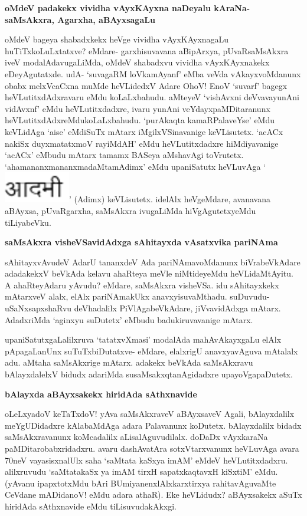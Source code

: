 {\bigskip
\noindent
{\large\bf oMdeV padakekx vividha vAyxKAyxna naDeyalu kAraNa- saMsAkxra, Agarxha, aBAyxsagaLu}}\label{page212}
\medskip

\noindent
oMdeV bageya shabadxkekx heVge vividha vAyxKAyxnagaLu huTiTxkoLuLxtatxve? eMdare- garxhisuvavana aBi\-pArxya, pUvaRsaMsAkxra iveV modalAdavugaLiMda, oMdeV shabadxvu vividha vAyxKAyxnakekx eDeyAgu\-tatxde. udA- `suvagaRM loVkamAyanf' eMba veVda vAkayxvoMdanunx obabx melxVcaCxna muMde heVLidedxV Adare OhoV! EnoV `suvarf' bagegx heVLutitxdAdxravaru eMdu koLaLxbahudu. aMteyeV `vishAvxni deVvavayu\-nAni vidAvxnf' eMdu heVLutitxdadxre, ivaru yunAni veYdayxpaMDitaranunx heVLutitxdAdxreMdukoLaLxbahudu. `purAkaqta kamaRPalaveYse' eMdu keVLidAga `aise' eMdiSuTx mAtarx iMgilxVSinavanige keVLisutetx. `acACx nakiSx duyxmatatxmoV rayiMdAH'\label{113} eMdu heVLutitxdadxre hiMdiyavanige `acACx' eMbudu mAtarx tamamx BASeya aMshavAgi toVrutetx. `ahamananxmananxmadaMtamAdimx' eMdu upaniSatutx heVLuvAga `{\includegraphics[scale=.6]{fig2.eps}}' (Adimx) keVLisutetx. idelAlx heVgeMdare, avanavana aBAyxsa, pUvaRgarxha, saMsAkxra ivugaLiMda hiVgAgutetxyeMdu tiLiyabeVku.

{\bigskip
\noindent
{\large\bf saMsAkxra visheVSavidAdxga sAhitayxda vAsatxvika pariNAma}}\label{page213}
\medskip

\noindent
sAhitayxvAvudeV AdarU tananxdeV Ada pariNAmavoMdanunx biVrabeVkAdare adadakekxV beVkAda kelavu ahaRteya meVle niMtideyeMdu heVLidaMtAyitu. A ahaRteyAdaru yAvudu? eMdare, saM\-sAkxra visheVSa. idu sAhitayxkekx mAtarxveV alalx, elAlx pariNAmakUkx anavxyisuvaMthadu. suDuvudu- uSaNxsapxshaRvu deVhadalilx PiVlAgabeVkAdare, jiVvavidAdxga mAtarx. AdadxriMda `aginxyu suDutetx' eMbudu badukiruvavanige mAtarx.

upaniSatutxgaLalilxruva `tatatxvXmasi' modalAda mahAvAkayxgaLu elAlx pApa\-gaLanUnx suTuTxbiDutatxve- eMdare, elalxrigU anavxyavAguva mAtalalx adu. \hbox{aMtaha} saMsAkxrige mAtarx. adakekx beVkAda saMsAkxravu bAlayxdalelxV bidudx adariMda susaMsakxqtanAgidadxre upayoVgapaDutetx.

{\bigskip
\noindent
{\large\bf bAlayxda aBAyxsakekx hiridAda sAthxnavide}}\label{page213}
\medskip

\noindent
oLeLxyadoV keTaTxdoV! yAva saMsAkxraveV aBAyxsaveV Agali, bAlayxdalilx meYgUDi\-dadxre kAlabaMdAga adara Palavanunx koDutetx. bAlayxdalilx bidadx saMsAkxravanunx koMcadalilx aLisalAguvudilalx. doDaDx vAyxkaraNa paMDitarobabxridadxru. avaru dashAvatAra sotxVtarxvanunx heVLuvAga avara 70neV vayasisxnalUlx saha `saM\-tata kaSxya imAM' eMdeV heVLutitxdadxru. alilxruvudu `saMtatakaSx ya imAM\label{213} tirxH sapatxkaqtavxH kiSxtiM' eMdu. (yAvanu ipapxtotxMdu bAri BUmiyanenxlAlxkarxtirxya rahitavAguvaMte CeVdane mADidanoV! eMdu adara athaR). Eke heVLidudx? aBAyxsakekx aSuTx hiridAda sAthxnavide eMdu tiLisuvudakAkxgi.

